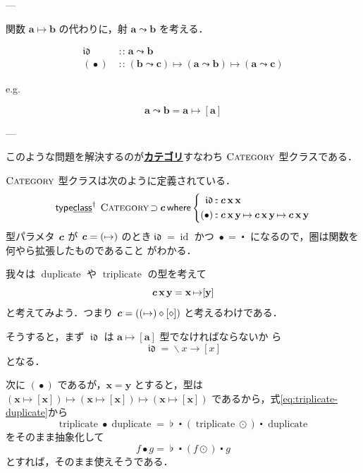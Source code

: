\documentclass[a5paper,twoside,fleqn,draft]{jsbook}
\newcommand{\keyword}[1]{{\underline{\textbf{#1}}}}
\newcommand{\mKeyword}[1]{\mathsf{#1}}
\newcommand{\mKeywordUnderline}[1]{\text{\underline{\textsf{#1}}}}
\newcommand{\mTypeClassDeclKeyword}{\mKeyword{type}\mKeywordUnderline{class}}
\newcommand{\mWhereKeyword}{\mKeyword{where}}
\DeclareMathOperator{\mSuperSet}{\supset}
\DeclareMathOperator{\mTypeClassDeclPolymorphic}{\mTypeClassDeclKeyword^\dagger}
\DeclareMathOperator{\mWhere}{\mWhereKeyword}
\newcommand{\mAnonParam}{\diamond}
\newcommand{\mSpecialFunc}[1]{#1}
\newcommand{\mVarSpecialFunc}[1]{\mathfrak{#1}}
\DeclareMathOperator{\mDuplicate}{\mSpecialFunc{duplicate}}
\DeclareMathOperator{\mId}{\mSpecialFunc{id}}
\DeclareMathOperator{\mIdCat}{\mVarSpecialFunc{id}}
\DeclareMathOperator{\mTriplicate}{\mSpecialFunc{triplicate}}
\DeclareMathOperator{\mComp}{\centerdot}
\DeclareMathOperator{\mCompCat}{\bullet}
\DeclareMathOperator{\mIn}{{:\!:}}
\DeclareMathOperator{\mJoinList}{\flat} %
\DeclareMathOperator{\mLambda}{\backslash}
\DeclareMathOperator{\mLambdaArrow}{\rightarrow}
\DeclareMathOperator{\mMapList}{\odot}
\DeclareMathOperator{\mMapsTo}{\mapsto}
\newcommand{\mType}[1]{\mathbf{#1}} %
\newcommand{\mPolymorphicTypeParameter}[1]{\textbf{\textit{#1}}}
\newcommand{\mA}{\mType{a}}
\newcommand{\mB}{\mType{b}}
\newcommand{\mC}{\mType{c}}
\newcommand{\mX}{\mType{x}}
\newcommand{\mY}{\mType{y}}
\newcommand{\mTypeClass}[1]{\textsc{#1}} %
\newcommand{\mCategoryTypeClass}{\mTypeClass{Category}}
\begin{document}
---

関数 $\mA\mMapsTo\mB$ の代わりに，射 $\mA\leadsto\mB$ を考える．

\begin{align}
  \mIdCat
  &\mIn{}\mA\leadsto\mB\\
  (\mCompCat)
  &\mIn{}(\mB\leadsto\mC)
  \mMapsTo(\mA\leadsto\mB)
  \mMapsTo(\mA\leadsto\mC)
\end{align}

e.g.

\begin{equation}
  \mA\leadsto\mB
  =\mA\mMapsTo[\mA]
\end{equation}

---


このような問題を解決するのが\keyword{カテゴリ}すなわち
$\mCategoryTypeClass$ 型クラスである．

$\mCategoryTypeClass$ 型クラスは次のように定義されている．
\begin{equation}
  \mTypeClassDeclPolymorphic\;
  \mCategoryTypeClass\mSuperSet\mPolymorphicTypeParameter{c}
  \mWhere\left\{
  \begin{aligned}
    \mIdCat&\mIn\mPolymorphicTypeParameter{c}\,\mX\,\mX\\
    (\mCompCat)
    &\mIn\mPolymorphicTypeParameter{c}\,\mX\,\mY
    \mMapsTo\mPolymorphicTypeParameter{c}\,\mX\,\mY
    \mMapsTo\mPolymorphicTypeParameter{c}\,\mX\,\mY
  \end{aligned}
  \right.
\end{equation}
型パラメタ $\mPolymorphicTypeParameter{c}$ が
$\mPolymorphicTypeParameter{c}=(\mMapsTo)$ のとき$\mIdCat=\mId$ かつ
$\mCompCat=\mComp$ になるので，圏は関数を何やら拡張したものであること
がわかる．

我々は $\mDuplicate$ や $\mTriplicate$ の型を考えて
\begin{equation}
  \mPolymorphicTypeParameter{c}\,\mX\,\mY
  =\mX\mMapsTo[\mY]
\end{equation}
と考えてみよう．つまり
$\mPolymorphicTypeParameter{c}=((\mMapsTo)\mAnonParam[\mAnonParam])$
と考えるわけである．

そうすると，まず $\mIdCat$ は $\mA\mMapsTo[\mA]$ 型でなければならないか
ら
\begin{equation}
  \label{eq:id-category}
  \mIdCat
  =\mLambda x\mLambdaArrow[x]
\end{equation}
となる．

次に $(\mCompCat)$ であるが，$\mX=\mY$ とすると，型は
$(\mX\mMapsTo[\mX])\mMapsTo(\mX\mMapsTo[\mX])\mMapsTo(\mX\mMapsTo[\mX])$
であるから，式\eqref{eq:triplicate-duplicate}から
\begin{equation}
  \mTriplicate\mCompCat\mDuplicate
  =\mJoinList\mComp(\mTriplicate\mMapList)\mComp\mDuplicate
\end{equation}
をそのまま抽象化して
\begin{equation}
  \label{eq:triplicate-duplicate-comp}
  f\mCompCat g=\mJoinList\mComp(f\mMapList)\mComp g
\end{equation}
とすれば，そのまま使えそうである．
\end{document}
